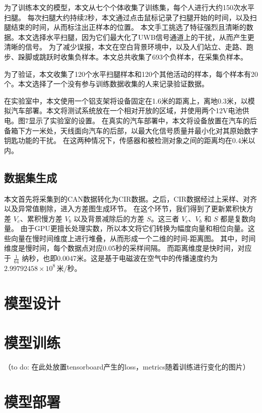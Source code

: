 为了训练本文的模型，本文从七个个体收集了训练集，每个人进行大约150次水平扫腿。
每次扫腿大约持续2秒，本文通过点击鼠标记录了扫腿开始的时间，以及扫腿结束的时间，从而标注出正样本的位置。
本文手工挑选了特征强烈且清晰的数据。本文选择水平扫腿，因为它们最大化了UWB信号通道上的干扰，从而产生更清晰的信号。
为了减少误报，本文在空白背景环境中，以及人们站立、走路、跑步、跺脚或跳跃时收集负样本。本文总共收集了693个负样本，在采集负样本。

为了验证，本文收集了120个水平扫腿样本和120个其他活动的样本，每个样本有20个。本文选择了一个没有参与训练数据收集的人来记录验证数据。

在实验室中，本文使用一个铝支架将设备固定在1.6米的距离上，离地0.3米，以模拟汽车部署。本文将测试系统放在一个相对开放的区域，并使用两个12V电池供电。图7显示了实验室的设置。
在真实的汽车部署中，本文将设备放置在汽车的后备箱下方一米处，天线面向汽车的后部，以最大化信号质量并最小化对其原始数字钥匙功能的干扰。
在这两种情况下，传感器和被检测对象之间的距离均在0.4米以内。

\subsection{数据集生成}
本文首先将采集到的CAN数据转化为CIR数据。之后，CIR数据经过上采样、对齐以及异常值剔除，进入方差图生成环节。
在这个环节，我们得到了更新累积快方差 \(V_c\)、累积慢方差 \(V_b\) 以及背景减除后的方差 \(S\)。这三者 \(V_c\)、\(V_b\) 和 \(S\) 都是复数向量。
由于GPU更擅长处理实数，所以本文将它们转换为幅度向量和相位向量。这些向量在慢时间维度上进行堆叠，从而形成一个二维的时间-距离图。
其中，时间维度是慢时间，每个数据点对应0.05秒的采样间隔。
而距离维度是快时间，对应于 \( \frac{1}{64} \) 纳秒，也即0.0047米。这是基于电磁波在空气中的传播速度约为 \(2.99792458 \times 10^8 \, \text{米/秒}\)。


\section{模型设计}
\section{模型训练}
（to do: 在此处放置tensorboard产生的loss，metrics随着训练进行变化的图片）

\section{模型部署}





